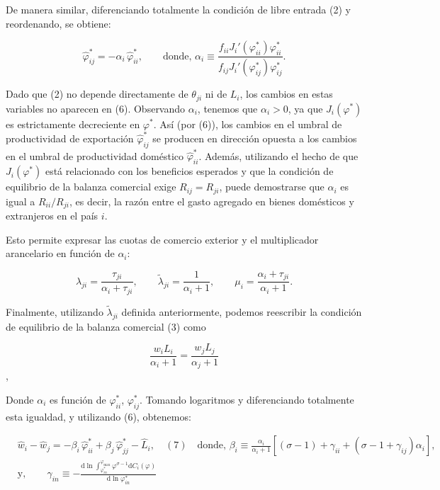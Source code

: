 \documentclass[10pt,a4paper]{article}
\begin{document}
De manera similar, diferenciando totalmente la condición de libre entrada (2) y reordenando, se obtiene:

$$\hat{\varphi}_{ij}^* = -\alpha_i \,\hat{\varphi}_{ii}^*, \tag{6}\qquad \text{donde},\,\alpha_i \equiv\frac{f_{ii} J_i'(\varphi_{ii}^*) \varphi_{ii}^*}{f_{ij} J_i'(\varphi_{ij}^*) \varphi_{ij}^*}.$$

Dado que (2) no depende directamente de $\theta_{ji}$ ni de $L_i$, los cambios en estas variables no aparecen en (6). Observando $\alpha_i$, tenemos que $\alpha_i > 0$, ya que $J_i(\varphi^*)$ es estrictamente decreciente en $\varphi^*$. Así (por (6)), los cambios en el umbral de productividad de exportación $\hat{\varphi}_{ij}^*$ se producen en dirección opuesta a los cambios en el umbral de productividad doméstico $\hat{\varphi}_{ii}^*$. Además, utilizando el hecho de que $J_i(\varphi^*)$ está relacionado con los beneficios esperados y que la condición de equilibrio de la balanza comercial exige $R_{ij} = R_{ji}$, puede demostrarse que $\alpha_i$ es igual a $R_{ii}/R_{ji}$, es decir, la razón entre el gasto agregado en bienes domésticos y extranjeros en el país $i$.

Esto permite expresar las cuotas de comercio exterior y el multiplicador arancelario en función de $\alpha_i$:

$$\lambda_{ji} = \frac{\tau_{ji}}{\alpha_i + \tau_{ji}},\qquad\tilde{\lambda}_{ji} = \frac{1}{\alpha_i + 1}, \qquad \mu_i = \frac{\alpha_i + \tau_{ji}}{\alpha_i + 1}.$$

Finalmente, utilizando $\tilde{\lambda}_{ji}$ definida anteriormente, podemos reescribir la condición de equilibrio de la balanza comercial (3) como

$$\frac{w_i L_i}{\alpha_i + 1} = \frac{w_j L_j}{\alpha_j + 1}$$,

Donde $\alpha_i$ es función de $\varphi_{ii}^*$, $\varphi_{ij}^*$. Tomando logaritmos y diferenciando totalmente esta igualdad, y utilizando (6), obtenemos:

$$\begin{aligned}
    &\hat{w}_i - \hat{w}_j = -\beta_i \,\hat{\varphi}_{ii}^* + \beta_j \,\hat{\varphi}_{jj}^* - \hat{L}_i,\quad (7)\quad \text{donde},\,\beta_i \equiv\frac{\alpha_i}{\alpha_i + 1}\left[(\sigma - 1) + \gamma_{ii} + (\sigma - 1 + \gamma_{ij}) \alpha_i\right],\\[2em]
    &\text{y},\qquad \gamma_{in} \equiv - \frac{\mathrm d \ln \int_{\varphi_{in}^*}^{\varphi_{\max}} \varphi^{\sigma-1} \mathrm dC_i(\varphi)}{\mathrm d \ln \varphi_{in}^*}
\end{aligned}$$
\end{document}
